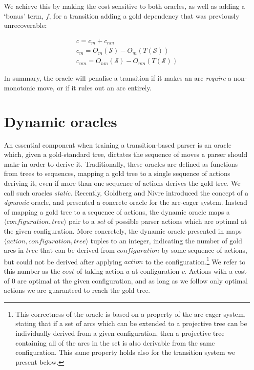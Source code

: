 \documentclass[11pt,letterpaper]{article}
\newcommand{\tuple}[1]{$\langle#1\rangle$}
\newcommand{\state}{\mathcal{S}}
\begin{document}
We achieve this by making the cost sensitive to both oracles, as well as adding a
`bonus' term, $f$, for a transition adding a gold dependency that was previously
unrecoverable:

\begin{eqnarray}
c = c_m + c_{nm}\\
c_m = O_m(\state) - O_m(T(\state))\\
c_{nm} = O_{nm}(\state) - O_{nm}(T(\state))
\end{eqnarray}

In summary, the oracle will penalise a transition if it makes an arc \emph{require}
a non-monotonic move, or if it rules out an arc entirely.

\section{Dynamic oracles}

 An essential component when training a transition-based parser is an oracle
 which, given a gold-standard tree, dictates the sequence of moves a parser
 should make in order to derive it.  Traditionally, these oracles are defined
 as functions from trees to sequences, mapping a gold tree to a single sequence
of actions deriving it, even if more than one sequence of actions derives the
gold tree. We call such oracles \emph{static}.  Recently, Goldberg and Nivre
 introduced the concept of a \emph{dynamic} oracle, and
presented a concrete oracle for the arc-eager system.  Instead of mapping a
gold tree to a sequence of actions, the dynamic oracle maps a
\tuple{configuration, tree} pair to a \emph{set} of possible parser actions
which are optimal at the given configuration.  More concretely, the dynamic
oracle presented in \cite{coling2012} maps \tuple{action,configuration,tree}
tuples to an integer, indicating the number of gold arcs in $tree$ that can be
derived from $configuration$ by some sequence of actions, but could not be derived
after applying $action$ to the configuration.\footnote{This correctness of
the oracle is based on a property of the arc-eager system, stating that if a
set of arcs which can be extended to a projective tree can be individually
derived from a given configuration, then a projective tree containing all of
the arcs in the set is also derivable from the same configuration.  This same
property holds also for the transition system we present below.} We refer to
this number as the $cost$ of taking action $a$ at configuration $c$. Actions
with a cost of 0 are optimal at the given configuration, and as long as we
follow only optimal actions we are guaranteed to reach the gold tree.
\end{document}
